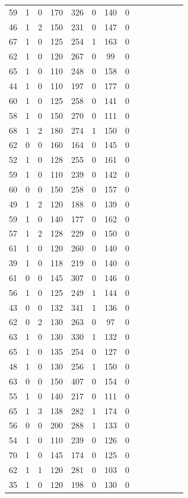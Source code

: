 \documentclass{article}
\begin{document}
\begin{longtable}{|c|c|c|c|c|c|c|c|c|c|c|c|c|c|}
59 & 1 & 0 & 170 & 326 & 0 & 140 & 0\\
46 & 1 & 2 & 150 & 231 & 0 & 147 & 0\\
67 & 1 & 0 & 125 & 254 & 1 & 163 & 0\\
62 & 1 & 0 & 120 & 267 & 0 & 99 & 0\\
65 & 1 & 0 & 110 & 248 & 0 & 158 & 0\\
44 & 1 & 0 & 110 & 197 & 0 & 177 & 0\\
60 & 1 & 0 & 125 & 258 & 0 & 141 & 0\\
58 & 1 & 0 & 150 & 270 & 0 & 111 & 0\\
68 & 1 & 2 & 180 & 274 & 1 & 150 & 0\\
62 & 0 & 0 & 160 & 164 & 0 & 145 & 0\\
52 & 1 & 0 & 128 & 255 & 0 & 161 & 0\\
59 & 1 & 0 & 110 & 239 & 0 & 142 & 0\\
60 & 0 & 0 & 150 & 258 & 0 & 157 & 0\\
49 & 1 & 2 & 120 & 188 & 0 & 139 & 0\\
59 & 1 & 0 & 140 & 177 & 0 & 162 & 0\\
57 & 1 & 2 & 128 & 229 & 0 & 150 & 0\\
61 & 1 & 0 & 120 & 260 & 0 & 140 & 0\\
39 & 1 & 0 & 118 & 219 & 0 & 140 & 0\\
61 & 0 & 0 & 145 & 307 & 0 & 146 & 0\\
56 & 1 & 0 & 125 & 249 & 1 & 144 & 0\\
43 & 0 & 0 & 132 & 341 & 1 & 136 & 0\\
62 & 0 & 2 & 130 & 263 & 0 & 97 & 0\\
63 & 1 & 0 & 130 & 330 & 1 & 132 & 0\\
65 & 1 & 0 & 135 & 254 & 0 & 127 & 0\\
48 & 1 & 0 & 130 & 256 & 1 & 150 & 0\\
63 & 0 & 0 & 150 & 407 & 0 & 154 & 0\\
55 & 1 & 0 & 140 & 217 & 0 & 111 & 0\\
65 & 1 & 3 & 138 & 282 & 1 & 174 & 0\\
56 & 0 & 0 & 200 & 288 & 1 & 133 & 0\\
54 & 1 & 0 & 110 & 239 & 0 & 126 & 0\\
70 & 1 & 0 & 145 & 174 & 0 & 125 & 0\\
62 & 1 & 1 & 120 & 281 & 0 & 103 & 0\\
35 & 1 & 0 & 120 & 198 & 0 & 130 & 0\\

\end{longtable}
\end{document}
